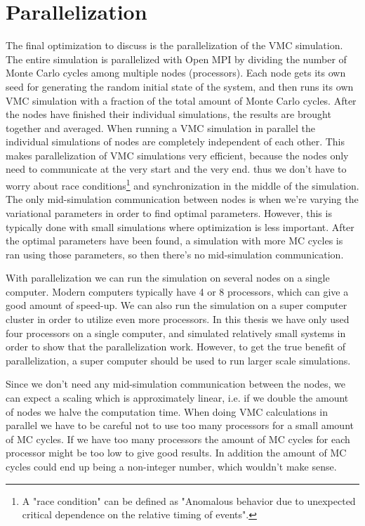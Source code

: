 \documentclass[../main.tex]{subfiles}
\begin{document}
\section{Parallelization}\label{sec:Parallel}

The final optimization to discuss is the parallelization of the VMC simulation. The entire simulation is parallelized with Open MPI by dividing the number of Monte Carlo cycles among multiple nodes (processors). Each node gets its own seed for generating the random initial state of the system, and then runs its own VMC simulation with a fraction of the total amount of Monte Carlo cycles. After the nodes have finished their individual simulations, the results are brought together and averaged. When running a VMC simulation in parallel the individual simulations of nodes are completely independent of each other. This makes parallelization of VMC simulations very efficient, because the nodes only need to communicate at the very start and the very end. thus we don't have to worry about race conditions\footnote{A "race condition" can be defined as "Anomalous behavior due to unexpected critical dependence on the relative timing of events".\cite{Wheeler}} and synchronization\cite{Blaise} in the middle of the simulation. The only mid-simulation communication between nodes is when we're varying the variational parameters in order to find optimal parameters. However, this is typically done with small simulations where optimization is less important. After the optimal parameters have been found, a simulation with more MC cycles is ran using those parameters, so then there's no mid-simulation communication. 

With parallelization we can run the simulation on several nodes on a single computer. Modern computers typically have 4 or 8 processors, which can give a good amount of speed-up. We can also run the simulation on a super computer cluster in order to utilize even more processors. In this thesis we have only used four processors on a single computer, and simulated relatively small systems in order to show that the parallelization work. However, to get the true benefit of parallelization, a super computer should be used to run larger scale simulations. 

Since we don't need any mid-simulation communication between the nodes, we can expect a scaling which is approximately linear, i.e. if we double the amount of nodes we halve the computation time. When doing VMC calculations in parallel we have to be careful not to use too many processors for a small amount of MC cycles. If we have too many processors the amount of MC cycles for each processor might be too low to give good results. In addition the amount of MC cycles could end up being a non-integer number, which wouldn't make sense.
\end{document}
